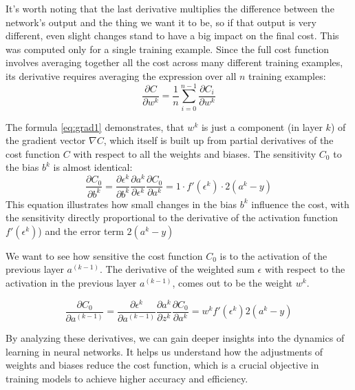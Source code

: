 It's worth noting that the last derivative multiplies the difference between the network's output and the thing we want it to be, so if that output is very different, even slight changes stand to have a big impact on the final cost.\newline
This was computed only for a single training example. Since the full cost function involves averaging together all the cost across many different training examples, its derivative requires averaging the expression over all $n$ training examples:
\begin{equation}
	\frac{\partial C}{\partial w^{k}} = \frac{1}{n} \sum_{i=0}^{n-1} \frac{\partial C_i}{\partial w^{k}}
	\label{eq:grad1}
\end{equation}

The formula \ref{eq:grad1} demonstrates, that $w^k$ is just a component (in layer $k$) of the gradient vector $\nabla C$, which itself is built up from partial derivatives of the cost function $C$ with respect to all the weights and biases.
The sensitivity $C_0$ to the bias $b^k$ is almost identical:
\begin{equation}
	\frac{\partial C_0}{\partial b^{k}} = \frac{\partial \epsilon^{k}}{\partial b^{k}} \frac{\partial a^{k}}{\partial \epsilon^{k}} \frac{\partial C_0}{\partial a^{k}} = 1 \cdot f'(\epsilon^{k}) \cdot 2(a^{k} - y)
\end{equation}
This equation  illustrates how small changes in the bias $b^k$ influence the cost, with the sensitivity directly proportional to the derivative of the activation function $f'(\epsilon^k)$) and the error term $2(a^k - y)$

We want to see how sensitive the cost function $C_0$ is to the activation of the previous layer $a^{(k-1)}$. The derivative of the weighted sum $\epsilon$ with respect to the activation in the previous layer $a^{(k-1)}$, comes out to be the weight $w^k$.

\begin{equation}
	\frac{\partial C_0}{\partial a^{(k-1)}} = \frac{\partial \epsilon^{k}}{\partial a^{(k-1)}} \frac{\partial a^{k}}{\partial z^{k}} \frac{\partial C_0}{\partial a^{k}} = w^{k} f'(\epsilon^{k}) 2(a^{k} - y)
\end{equation}

By analyzing these derivatives, we can gain deeper insights into the dynamics of learning in neural networks. It helps us understand how the adjustments of weights and biases reduce the cost function, which is a crucial objective in training models to achieve higher accuracy and efficiency.

